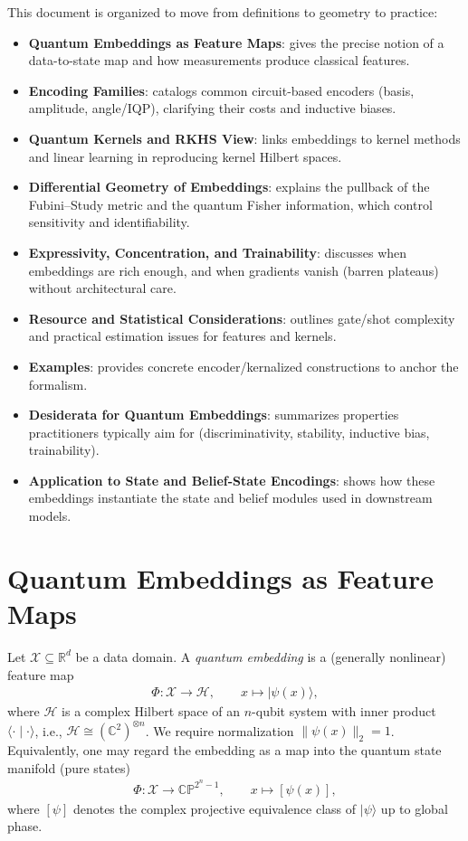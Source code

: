 \documentclass[11pt]{article}
\begin{document}
This document is organized to move from definitions to geometry to practice:
\begin{itemize}
  \item \textbf{Quantum Embeddings as Feature Maps}: gives the precise notion of a data-to-state map and how measurements produce classical features.
  \item \textbf{Encoding Families}: catalogs common circuit-based encoders (basis, amplitude, angle/IQP), clarifying their costs and inductive biases.
  \item \textbf{Quantum Kernels and RKHS View}: links embeddings to kernel methods and linear learning in reproducing kernel Hilbert spaces.
  \item \textbf{Differential Geometry of Embeddings}: explains the pullback of the Fubini--Study metric and the quantum Fisher information, which control sensitivity and identifiability.
  \item \textbf{Expressivity, Concentration, and Trainability}: discusses when embeddings are rich enough, and when gradients vanish (barren plateaus) without architectural care.
  \item \textbf{Resource and Statistical Considerations}: outlines gate/shot complexity and practical estimation issues for features and kernels.
  \item \textbf{Examples}: provides concrete encoder/kernalized constructions to anchor the formalism.
  \item \textbf{Desiderata for Quantum Embeddings}: summarizes properties practitioners typically aim for (discriminativity, stability, inductive bias, trainability).
  \item \textbf{Application to State and Belief-State Encodings}: shows how these embeddings instantiate the state and belief modules used in downstream models.
\end{itemize}

\section{Quantum Embeddings as Feature Maps}

Let \(\mathcal{X}\subseteq\mathbb{R}^d\) be a data domain. A \emph{quantum embedding} is a (generally nonlinear) feature map
\begin{align}
  \Phi: \mathcal{X} \to \mathcal{H},\qquad x\mapsto \lvert \psi(x) \rangle,\label{eq:featuremap}
\end{align}
where \(\mathcal{H}\) is a complex Hilbert space of an \(n\)-qubit system with inner product \(\langle \cdot \mid \cdot \rangle\), i.e., \(\mathcal{H}\cong (\mathbb{C}^2)^{\otimes n}\). We require normalization \(\lVert\psi(x)\rVert_2=1\). Equivalently, one may regard the embedding as a map into the quantum state manifold (pure states)
\begin{align}
  \Phi: \mathcal{X} \to \mathbb{CP}^{2^n-1},\qquad x\mapsto [\psi(x)],
\end{align}
where \([\psi]\) denotes the complex projective equivalence class of \(\lvert \psi\rangle\) up to global phase.
\end{document}
